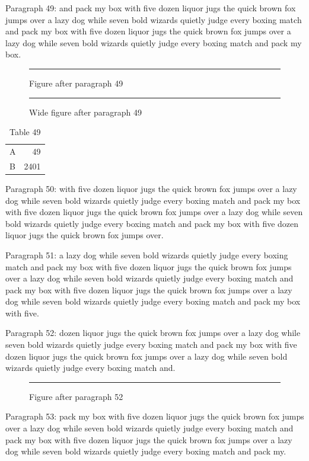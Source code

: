 \documentclass[twocolumn]{article}
\begin{document}
Paragraph 49: and pack my box with five dozen liquor jugs the quick brown fox jumps over a lazy dog while seven bold wizards quietly judge every boxing match and pack my box with five dozen liquor jugs the quick brown fox jumps over a lazy dog while seven bold wizards quietly judge every boxing match and pack my box.

\begin{figure}[tbp]\centering\rule{0.8\columnwidth}{8em}\caption{Figure after paragraph 49}\end{figure}
\begin{figure}[t]\centering\rule{0.7\textwidth}{7em}\caption{Wide figure after paragraph 49}\end{figure}
\begin{table}[htb]\centering\begin{tabular}{lr}A & 49\\ B & 2401\end{tabular}\caption{Table 49}\end{table}
Paragraph 50: with five dozen liquor jugs the quick brown fox jumps over a lazy dog while seven bold wizards quietly judge every boxing match and pack my box with five dozen liquor jugs the quick brown fox jumps over a lazy dog while seven bold wizards quietly judge every boxing match and pack my box with five dozen liquor jugs the quick brown fox jumps over.

Paragraph 51: a lazy dog while seven bold wizards quietly judge every boxing match and pack my box with five dozen liquor jugs the quick brown fox jumps over a lazy dog while seven bold wizards quietly judge every boxing match and pack my box with five dozen liquor jugs the quick brown fox jumps over a lazy dog while seven bold wizards quietly judge every boxing match and pack my box with five.

Paragraph 52: dozen liquor jugs the quick brown fox jumps over a lazy dog while seven bold wizards quietly judge every boxing match and pack my box with five dozen liquor jugs the quick brown fox jumps over a lazy dog while seven bold wizards quietly judge every boxing match and.

\begin{figure}[htbp]\centering\rule{0.8\columnwidth}{5em}\caption{Figure after paragraph 52}\end{figure}
Paragraph 53: pack my box with five dozen liquor jugs the quick brown fox jumps over a lazy dog while seven bold wizards quietly judge every boxing match and pack my box with five dozen liquor jugs the quick brown fox jumps over a lazy dog while seven bold wizards quietly judge every boxing match and pack my.
\end{document}
